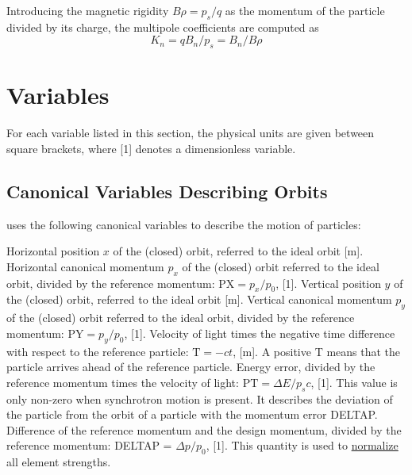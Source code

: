 Introducing the magnetic rigidity \(B \rho = p_s / q\) as the
momentum of the particle divided by its charge, the multipole
coefficients are computed as
\begin{equation}\label{eq:kn}
K_n = q B_n / p_s  =  B_n / B \rho 
\end{equation}



\section{Variables}
\label{sec:variables}

For each variable listed in this section, the physical units are given
between square brackets, where [1] denotes a dimensionless variable.

\subsection{Canonical Variables Describing Orbits}
\label{subsec:tables_canon}
\madx uses the following canonical variables to describe the motion of particles: 
\begin{madlist}
    Horizontal position $x$ of the (closed) orbit,
     referred to the ideal orbit [m].    
    Horizontal canonical momentum $p_x$ of the
     (closed) orbit referred to the ideal orbit, divided by the
     reference momentum: $\textrm{PX} = p_x / p_0$, [1].   
    Vertical position $y$ of the (closed) orbit, referred
     to the ideal orbit [m].   
    Vertical canonical momentum $p_y$ of the (closed)
     orbit referred to the ideal orbit, divided by the reference
     momentum: $\textrm{PY} = p_y / p_0$, [1].   
    Velocity of light times the negative time difference with
     respect to the reference particle: $\textrm{T} =  - c t$, [m]. A
     positive T means that the particle arrives ahead of the reference
     particle.   
    Energy error, divided by the reference momentum times the
     velocity of light: $\textrm{PT} = \Delta E / p_s c$, [1]. 
     This value is only non-zero when synchrotron motion is
     present. It describes the deviation of the particle from the orbit
     of a particle with the momentum error DELTAP.   
    Difference of the reference momentum and the design
     momentum, divided by the reference momentum: DELTAP =
     $\Delta p / p_0$, [1]. This quantity is used to
     \hyperref[chap:differences]{normalize} all element strengths.   
\end{madlist} 

